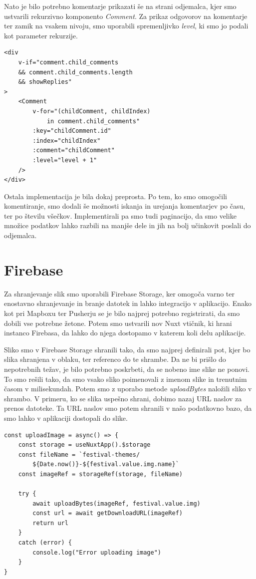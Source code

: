 \documentclass[a4paper,12pt,openright]{book}
\begin{document}
Nato je bilo potrebno komentarje prikazati še na strani odjemalca, kjer smo ustvarili rekurzivno komponento \textit{Comment}.
Za prikaz odgovorov na komentarje ter zamik na vsakem nivoju, smo uporabili spremenljivko \textit{level}, ki smo jo podali kot parameter rekurzije.
\begin{lstlisting}[label=code15,caption=Rekurzivna komponenta za prikaz komentarjev na strani odjemalca.,frame=tb,captionpos=b]
<div 
    v-if="comment.child_comments
    && comment.child_comments.length
    && showReplies"
>
    <Comment
        v-for="(childComment, childIndex)
            in comment.child_comments"
        :key="childComment.id"
        :index="childIndex"
        :comment="childComment"
        :level="level + 1"
    />
</div>
\end{lstlisting}

Ostala implementacija je bila dokaj preprosta.
Po tem, ko smo omogočili komentiranje, smo dodali še možnosti iskanja in urejanja komentarjev po času, ter po številu všečkov.
Implementirali pa smo tudi paginacijo, da smo velike množice podatkov lahko razbili na manjše dele in jih na bolj učinkovit poslali do odjemalca.

\section{Firebase}
Za shranjevanje slik smo uporabili Firebase Storage, ker omogoča varno ter enostavno shranjevanje in branje datotek in lahko integracijo v aplikacijo.
Enako kot pri Mapboxu ter Pusherju se je bilo najprej potrebno registrirati, da smo dobili vse potrebne žetone.
Potem smo ustvarili nov Nuxt vtičnik, ki hrani instanco Firebasa, da lahko do njega dostopamo v katerem koli delu aplikacije.

Sliko smo v Firebase Storage shranili tako, da smo najprej definirali pot, kjer bo slika shranjena v oblaku, ter referenco do te shrambe.
Da ne bi prišlo do nepotrebnih težav, je bilo potrebno poskrbeti, da se nobeno ime slike ne ponovi.
To smo rešili tako, da smo vsako sliko poimenovali z imenom slike in trenutnim časom v milisekundah.
Potem smo z uporabo metode \textit{uploadBytes} naložili sliko v shrambo.
V primeru, ko se slika uspešno shrani, dobimo nazaj URL naslov za prenos datoteke.
Ta URL naslov smo potem shranili v našo podatkovno bazo, da smo lahko v aplikaciji dostopali do slike.
\begin{lstlisting}[label=code16,caption=Nuxt vtičnik za shranjevanje slik z uporabo Firebase Storage.,frame=tb,captionpos=b]
const uploadImage = async() => {
    const storage = useNuxtApp().$storage
    const fileName = `festival-themes/
        ${Date.now()}-${festival.value.img.name}`
    const imageRef = storageRef(storage, fileName)

    try {
        await uploadBytes(imageRef, festival.value.img)
        const url = await getDownloadURL(imageRef)
        return url 
    }
    catch (error) {
        console.log("Error uploading image")
    }
}
\end{lstlisting}
\end{document}
